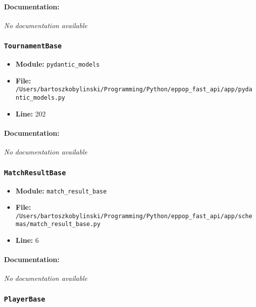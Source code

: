 \documentclass[11pt,a4paper]{article}
\begin{document}
\paragraph{Documentation:} \textit{No documentation available}


\vspace{1em}
\subsubsection{\texttt{TournamentBase}}

\begin{itemize}
    \item \textbf{Module:} \texttt{pydantic\_models}
    \item \textbf{File:} \texttt{/Users/bartoszkobylinski/Programming/Python/eppop\_fast\_api/app/pydantic\_models.py}
    \item \textbf{Line:} 202
\end{itemize}

\paragraph{Documentation:} \textit{No documentation available}


\vspace{1em}
\subsubsection{\texttt{MatchResultBase}}

\begin{itemize}
    \item \textbf{Module:} \texttt{match\_result\_base}
    \item \textbf{File:} \texttt{/Users/bartoszkobylinski/Programming/Python/eppop\_fast\_api/app/schemas/match\_result\_base.py}
    \item \textbf{Line:} 6
\end{itemize}

\paragraph{Documentation:} \textit{No documentation available}


\vspace{1em}
\subsubsection{\texttt{PlayerBase}}
\end{document}
